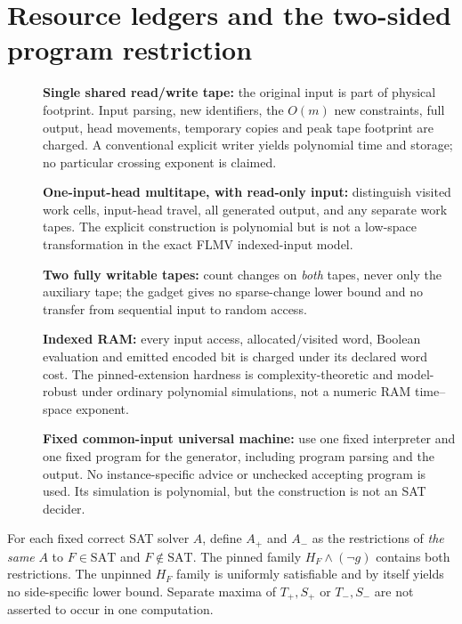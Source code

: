 \documentclass[11pt]{article}
\begin{document}
\section{Resource ledgers and the two-sided program restriction}
\begin{description}
\item[]\textbf{Single shared read/write tape:} the original input is part of physical footprint. Input parsing, new identifiers, the $O(m)$ new constraints, full output, head movements, temporary copies and peak tape footprint are charged. A conventional explicit writer yields polynomial time and storage; no particular crossing exponent is claimed.
\item[]\textbf{One-input-head multitape, with read-only input:} distinguish visited work cells, input-head travel, all generated output, and any separate work tapes. The explicit construction is polynomial but is not a low-space transformation in the exact FLMV indexed-input model.
\item[]\textbf{Two fully writable tapes:} count changes on \emph{both} tapes, never only the auxiliary tape; the gadget gives no sparse-change lower bound and no transfer from sequential input to random access.
\item[]\textbf{Indexed RAM:} every input access, allocated/visited word, Boolean evaluation and emitted encoded bit is charged under its declared word cost. The pinned-extension hardness is complexity-theoretic and model-robust under ordinary polynomial simulations, not a numeric RAM time--space exponent.
\item[]\textbf{Fixed common-input universal machine:} use one fixed interpreter and one fixed program for the generator, including program parsing and the output. No instance-specific advice or unchecked accepting program is used. Its simulation is polynomial, but the construction is not an SAT decider.
\end{description}
For each fixed correct SAT solver $A$, define $A_{+}$ and $A_{-}$ as the restrictions of \emph{the same} $A$ to $F\in\mathrm{SAT}$ and $F\notin\mathrm{SAT}$. The pinned family $H_F\wedge(\neg g)$ contains both restrictions. The unpinned $H_F$ family is uniformly satisfiable and by itself yields no side-specific lower bound. Separate maxima of $T_{+},S_{+}$ or $T_{-},S_{-}$ are not asserted to occur in one computation.
\end{document}
